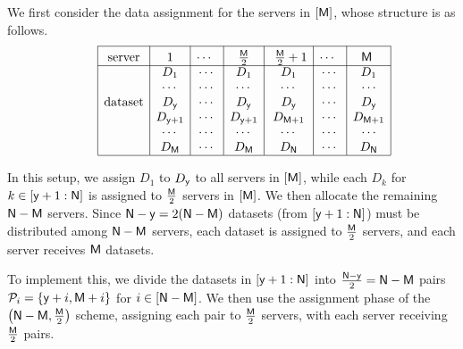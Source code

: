 \documentclass[conference,letterpaper]{IEEEtran}
\begin{document}
We first consider the data assignment for the servers in $[{\sf M}]$, whose structure is as follows.
\begin{align*}
\begin{array}{rl|c|c|c|c|c|c|c|}\cline{3-3}\cline{4-4}\cline{5-5}\cline{6-6}\cline{7-7}\cline{8-8}\cline{9-9}
&&\rule{0pt}{1.2em}\mbox{server}&\rule{0pt}{1.2em}\mbox{1} &\rule{0pt}{1.2em}\mbox{$\cdots$ } &  \rule{0pt}{1.2em}\mbox{ $\frac{\Msf}{2}$ } & \rule{0pt}{1.2em}\mbox{ $\frac{\Msf}{2}  +1$}&  \rule{0pt}{1.2em}\mbox{$\cdots$ } &  \rule{0pt}{1.2em}\mbox{$\Msf$ }\\ 
\cline{3-3}\cline{4-4}\cline{5-5}\cline{6-6}\cline{7-7}\cline{8-8}\cline{9-9}
&& &D_1 & \cdots & D_1 & D_1 & \cdots & D_1 \\
&& &\cdots & \cdots & \cdots & \cdots & \cdots & \cdots \\ 
&& \mbox{dataset}&D_{\ysf} & \cdots & D_{\ysf} & D_{\ysf} & \cdots & D_{\ysf} \\
&& &D_{\ysf+1} & \cdots & D_{\ysf+1} & D_{\Msf+1} & \cdots & D_{\Msf+1} \\ 
&& &\cdots & \cdots & \cdots & \cdots & \cdots & \cdots \\
&& &D_{\Msf} & \cdots & D_{\Msf}&  D_{\Nsf} & \cdots & D_{\Nsf}\\  
\cline{3-3}\cline{4-4}\cline{5-5}\cline{6-6}\cline{7-7}\cline{8-8}\cline{9-9}
\end{array}
\end{align*}


In this setup, we assign \(D_1\) to \(D_{{\sf y}}\) to all servers in \([{\sf M}]\), while each \(D_k\) for \(k \in [{\sf y}+1 : {\sf N}]\) is assigned to \(\frac{{\sf M}}{2}\) servers in \([{\sf M}]\). We then allocate the remaining \({\sf N}-{\sf M}\) servers. Since \({\sf N}-{\sf y} = 2({\sf N}-{\sf M})\) datasets (from \([{\sf y}+1 : {\sf N}]\)) must be distributed among \({\sf N}-{\sf M}\) servers, each dataset is assigned to \(\frac{{\sf M}}{2}\) servers, and each server receives \({\sf M}\) datasets. 

To implement this, we divide the datasets in \([{\sf y}+1 : {\sf N}]\) into \(\frac{{\sf N}-{\sf y}}{2} = {\sf N}-{\sf M}\) pairs \({\cal P}_i = \{{\sf y} + i, {\sf M} + i\}\) for \(i \in [{\sf N}-{\sf M}]\). We then use the assignment phase of the \(\bigl({\sf N}-{\sf M}, \tfrac{{\sf M}}{2}\bigr)\) scheme, assigning each pair to \(\tfrac{{\sf M}}{2}\) servers, with each server receiving \(\tfrac{{\sf M}}{2}\) pairs.
\end{document}
